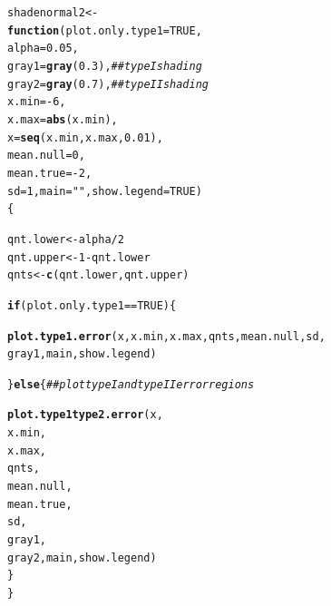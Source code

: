 \documentclass[12pt]{book}\usepackage[]{graphicx}\usepackage[]{color}
\makeatletter
\newcommand{\hlnum}[1]{\textcolor[rgb]{0.686,0.059,0.569}{#1}}%
\newcommand{\hlstr}[1]{\textcolor[rgb]{0.192,0.494,0.8}{#1}}%
\newcommand{\hlcom}[1]{\textcolor[rgb]{0.678,0.584,0.686}{\textit{#1}}}%
\newcommand{\hlopt}[1]{\textcolor[rgb]{0,0,0}{#1}}%
\newcommand{\hlstd}[1]{\textcolor[rgb]{0.345,0.345,0.345}{#1}}%
\newcommand{\hlkwa}[1]{\textcolor[rgb]{0.161,0.373,0.58}{\textbf{#1}}}%
\newcommand{\hlkwb}[1]{\textcolor[rgb]{0.69,0.353,0.396}{#1}}%
\newcommand{\hlkwc}[1]{\textcolor[rgb]{0.333,0.667,0.333}{#1}}%
\newcommand{\hlkwd}[1]{\textcolor[rgb]{0.737,0.353,0.396}{\textbf{#1}}}%
\newenvironment{kframe}{%
 \def\at@end@of@kframe{}%
 \ifinner\ifhmode%
  \def\at@end@of@kframe{\end{minipage}}%
  \begin{minipage}{\columnwidth}%
 \fi\fi%
 \def\FrameCommand##1{\hskip\@totalleftmargin \hskip-\fboxsep
 \colorbox{shadecolor}{##1}\hskip-\fboxsep
     \hskip-\linewidth \hskip-\@totalleftmargin \hskip\columnwidth}%
 \MakeFramed {\advance\hsize-\width
   \@totalleftmargin\z@ \linewidth\hsize
   \@setminipage}}%
 {\par\unskip\endMakeFramed%
 \at@end@of@kframe}
\newenvironment{knitrout}{}{} %
\makeatother
\begin{document}
\begin{knitrout}
\color{fgcolor}\begin{kframe}
\begin{alltt}
\hlstd{shadenormal2}\hlkwb{<-}
\hlkwa{function} \hlstd{(}\hlkwc{plot.only.type1}\hlstd{=}\hlnum{TRUE}\hlstd{,}
          \hlkwc{alpha}\hlstd{=}\hlnum{0.05}\hlstd{,}
          \hlkwc{gray1}\hlstd{=}\hlkwd{gray}\hlstd{(}\hlnum{0.3}\hlstd{),} \hlcom{## type I shading}
          \hlkwc{gray2}\hlstd{=}\hlkwd{gray}\hlstd{(}\hlnum{0.7}\hlstd{),} \hlcom{## type II shading}
          \hlkwc{x.min}\hlstd{=}\hlopt{-}\hlnum{6}\hlstd{,}
          \hlkwc{x.max}\hlstd{=}\hlkwd{abs}\hlstd{(x.min),}
          \hlkwc{x} \hlstd{=} \hlkwd{seq}\hlstd{(x.min, x.max,} \hlnum{0.01}\hlstd{),}
          \hlkwc{mean.null}\hlstd{=}\hlnum{0}\hlstd{,}
          \hlkwc{mean.true}\hlstd{=}\hlopt{-}\hlnum{2}\hlstd{,}
          \hlkwc{sd}\hlstd{=}\hlnum{1}\hlstd{,}\hlkwc{main}\hlstd{=}\hlstr{""}\hlstd{,}\hlkwc{show.legend}\hlstd{=}\hlnum{TRUE}\hlstd{)}
\hlstd{\{}

    \hlstd{qnt.lower}\hlkwb{<-}\hlstd{alpha}\hlopt{/}\hlnum{2}
    \hlstd{qnt.upper}\hlkwb{<-}\hlnum{1}\hlopt{-}\hlstd{qnt.lower}
    \hlstd{qnts}\hlkwb{<-}\hlkwd{c}\hlstd{(qnt.lower,qnt.upper)}

    \hlkwa{if}\hlstd{(plot.only.type1}\hlopt{==}\hlnum{TRUE}\hlstd{)\{}

     \hlkwd{plot.type1.error}\hlstd{(x,x.min,x.max,qnts,mean.null,sd,}
     \hlstd{gray1,main,show.legend)}

    \hlstd{\}} \hlkwa{else} \hlstd{\{} \hlcom{## plot type I and type II error regions}

   \hlkwd{plot.type1type2.error}\hlstd{(x,}
                         \hlstd{x.min,}
                         \hlstd{x.max,}
                         \hlstd{qnts,}
                         \hlstd{mean.null,}
                         \hlstd{mean.true,}
                         \hlstd{sd,}
                         \hlstd{gray1,}
                         \hlstd{gray2,main,show.legend)}
     \hlstd{\}}
\hlstd{\}}
\end{alltt}
\end{kframe}
\end{knitrout}
\end{document}
